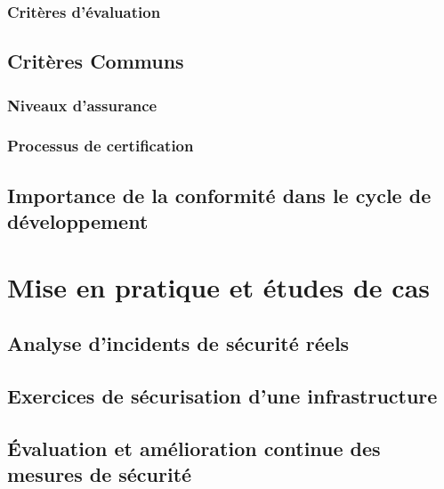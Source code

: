 \subsubsection{Critères d'évaluation}
\subsection{Critères Communs}
\subsubsection{Niveaux d'assurance}
\subsubsection{Processus de certification}
\subsection{Importance de la conformité dans le cycle de développement}
\section{Mise en pratique et études de cas}
\subsection{Analyse d'incidents de sécurité réels}
\subsection{Exercices de sécurisation d'une infrastructure}
\subsection{Évaluation et amélioration continue des mesures de sécurité}